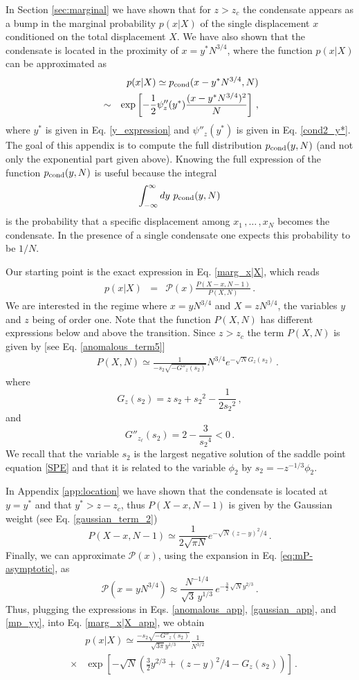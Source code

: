 \documentclass[aps,pre,twocolumn,superscriptaddress,showpacs]{revtex4-1}
\newcommand{\be}{\begin{equation}}
\newcommand{\ee}{\end{equation}}
\newcommand{\bea}{\begin{eqnarray}}
\newcommand{\eea}{\end{eqnarray}}
\newcommand{\mP}{\mathcal{P}}
\begin{document}
In Section \ref{sec:marginal} we have shown that for $z>z_c$ the condensate appears as a bump in the marginal probability $p(x|X)$ of the single displacement $x$ conditioned on the total displacement $X$. We have also shown that the condensate is located in the proximity of $x=y^* N^{3/4}$, where the function $p(x|X)$ can be approximated as
\bea
&&p(x|X)\simeq p_{\rm cond}(x-y^*N^{3/4},N) \\
&\sim &\exp\left[-\frac12 \psi''_z(y^*) \frac{(x-y^* N^{3/4})^2}{N}\right]\,,\nonumber
\eea
where $y^*$ is given in Eq. \eqref{y_expression} and $\psi''_z(y^*)$ is given in Eq. \eqref{cond2_y*}. The goal of this appendix is to compute the full distribution $p_{\rm cond}(y,N)$ (and not only the exponential part given above). Knowing the full expression of the function $p_{\rm cond}(y,N)$ is useful because the integral 
\be
\int_{-\infty}^{\infty}dy~p_{\rm cond}(y,N)
\ee
is the probability that a specific displacement among $x_1\,,\ldots\,,x_N$ becomes the condensate. In the presence of a single condensate one expects this probability to be $1/N$.


Our starting point is the exact expression in Eq. \eqref{marg_x|X}, which reads
\bea
p(x|X)&=&\mP(x)\frac{P(X-x,N-1)}{P(X,N)}\,.
\label{marg_x|X_app}
\eea
We are interested in the regime where $x=yN^{3/4}$ and $X=zN^{3/4}$, the variables $y$ and $z$ being of order one.
Note that the function $P(X,N)$ has different expressions below and above the transition. Since $z>z_c$ the term $P(X,N)$ is given by [see Eq. \eqref{anomalous_term5}]
\bea
&&P(X,N)\simeq \frac{1}{-s_2 \sqrt{-G''_z(s_2)}} N^{3/4} e^{-\sqrt{N}G_z(s_2)}\,.
\label{anomalous_app}
\eea
where
\be 
G_z(s_2)=z~ s_2+{s_2}^2-\frac{1}{2{s_2}^2}\,,
\label{G_app}
\ee
and
\be
G''_{z_{\ell}}(s_2)=2-\frac{3}{{s_2}^4}<0\,.
\label{G''_app}
\ee
We recall that the variable $s_2$ is the largest negative solution of the saddle point equation \eqref{SPE} and that it is related to the variable $\phi_2$ by $s_2=-z^{-1/3}\phi_2$.

In Appendix \ref{app:location} we have shown that the condensate is located at $y=y^*$ and that $y^*>z-z_c$, thus $P(X-x,N-1)$ is given by the Gaussian weight (see Eq. \eqref{gaussian_term_2})
\be
P(X-x,N-1)\simeq\frac{1}{2\sqrt{\pi N}}e^{-\sqrt{N} (z-y)^2/4}\,.
\label{gaussian_app}
\ee
Finally, we can approximate $\mP(x)$, using the expansion in Eq. \eqref{eq:mP-asymptotic}, as
\be 
\label{mp_yy}
\mP(x=yN^{3/4}) \approx \frac{N^{-1/4} }{\sqrt{3}\,
   y^{1/3}}\, e^{-\frac{3}{2}\, \sqrt{N} y^{2/3}}\, .
\ee
Thus, plugging the expressions in Eqs. \eqref{anomalous_app}, \eqref{gaussian_app}, and \eqref{mp_yy}, into Eq. \eqref{marg_x|X_app}, we obtain 
\bea
&&p(x|X)\simeq \frac{ - s_2 \sqrt{-G''_z(s_2)}}{\sqrt{3\pi} y^{1/3}}\frac{1}{N^{3/2}}\\
&\times &\exp\left[-\sqrt{N}\left(\frac{3}{2}y^{2/3}+(z-y)^2/4-G_z(s_2)\right)\right]\,.\nonumber
\label{marg_x|X_app2}
\eea
\end{document}
